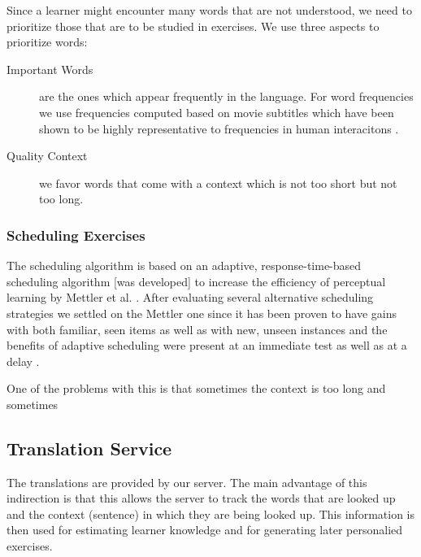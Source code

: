 Since a learner might encounter many words that are not understood, we need to prioritize those that are to be studied in exercises. We use three aspects to prioritize words: 


\begin{description}

  \item [Important Words] are the ones which appear frequently in the language. For word frequencies we use frequencies computed based on movie subtitles which have been shown to be highly representative to frequencies in human interacitons \cite{New07-subtitles}. 
  
  \item [Quality Context] we favor words that come with a context which is not too short but not too long. 

\end{description}

\subsubsection{Scheduling Exercises}

The scheduling algorithm is based on an adaptive, response-time-based scheduling algorithm [was developed] to increase the efficiency of perceptual learning by Mettler et al. \cite{Mettler14-ARTS}. After evaluating several alternative scheduling strategies we settled on the Mettler one since it has been proven to have gains with both familiar, seen items as well as with new, unseen instances and the benefits of adaptive scheduling were present at an immediate test as well as at a delay \cite{Mettler14-ARTS}.



One of the problems with this is that sometimes the context is too long and sometimes 


\subsection{Translation Service}

The translations are provided by our server. The main advantage of this indirection is that this allows the server to track the words that are looked up and the context (sentence) in which they are being looked up. This information is then used for estimating learner knowledge and for generating later personalied exercises. 


